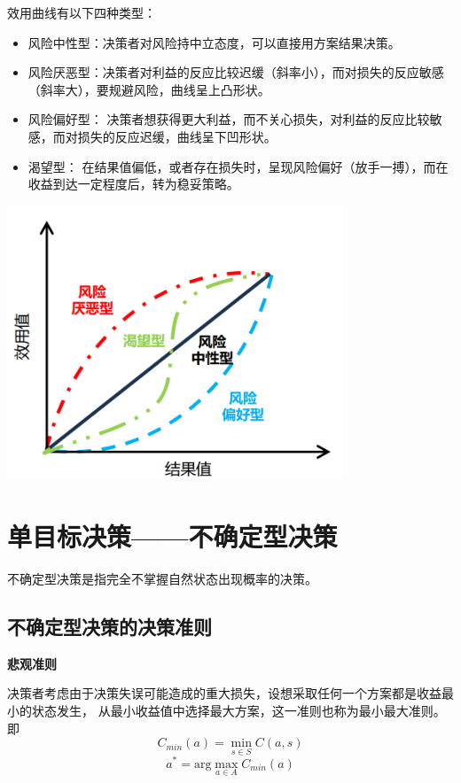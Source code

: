 \documentclass[a4paper,12pt]{article}
\begin{document}
效用曲线有以下四种类型：
\begin{itemize}[itemsep=0pt,parsep=0pt]
    \item 风险中性型：决策者对风险持中立态度，可以直接用方案结果决策。
    \item 风险厌恶型：决策者对利益的反应比较迟缓（斜率小），而对损失的反应敏感（斜率大），要规避风险，曲线呈上凸形状。
    \item 风险偏好型： 决策者想获得更大利益，而不关心损失，对利益的反应比较敏感，而对损失的反应迟缓，曲线呈下凹形状。
    \item 渴望型： 在结果值偏低，或者存在损失时，呈现风险偏好（放手一搏），而在收益到达一定程度后，转为稳妥策略。
\end{itemize}

\begin{center}
    \includegraphics[width=10cm]{效用函数类型.png}
\end{center}

\section{单目标决策——不确定型决策}

不确定型决策是指完全不掌握自然状态出现概率的决策。

\subsection{不确定型决策的决策准则}

\noindent
\textbf{悲观准则}

决策者考虑由于决策失误可能造成的重大损失，设想采取任何一个方案都是收益最小的状态发生，
从最小收益值中选择最大方案，这一准则也称为最小最大准则。即
$$
C_{min}\left(a\right)=\min_{s\in S}C\left(a,s\right)
$$
$$
a^*=\text{arg}\max_{a\in A}C_{min}\left(a\right)
$$
\end{document}

